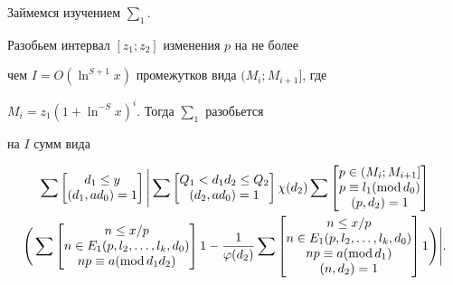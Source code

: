 Займемся изучением $\sum_1$.


Разобьем интервал $[z_1; z_2]$ изменения $p$ на не более


чем $I=O ( \ln^{S+1}x )$ промежутков вида $(M_{i};M_{i+1}]$, где


$M_{i}=z_1( 1 + \ln^{-S} x )^i$. Тогда $\sum_1$ разобьется


на $I$ сумм вида


\begin{multline*}


\sum 


\begin{bmatrix}


d_1 \le y \\ (d_1,ad_0)=1


\end{bmatrix} 


\Bigg | \sum 


\begin{bmatrix}


Q_1 < d_1d_2 \le Q_2 \\ (d_2,ad_0)=1


\end{bmatrix} 


\chi(d_2)\sum 


\begin{bmatrix}


p\in(M_{i};M_{i+1}]\\


p\equiv l_1(\Mod d_0)\\


(p,d_2)=1


\end{bmatrix} 


\\


\Bigg( \sum 


\begin{bmatrix}


n \le x/p\\


n\in E_1(p,l_2,\dotsc,l_k,d_0)\\


np \equiv a (\Mod d_1d_2)


\end{bmatrix} 


1 - \frac1{\varphi(d_2)} \sum 


\begin{bmatrix}


n \le x/p\\


n\in E_1(p,l_2,\dotsc,l_k,d_0)\\


np \equiv a (\Mod d_1)\\


(n,d_2)=1


\end{bmatrix} 1 \Bigg) \Bigg|.


\end{multline*}


